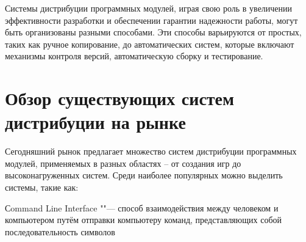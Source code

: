 Системы дистрибуции программных модулей, играя свою роль в увеличении эффективности разработки и обеспечении гарантии надежности работы, могут быть организованы разными способами. Эти способы варьируются от простых, таких как ручное копирование, до автоматических систем, которые включают механизмы контроля версий, автоматическую сборку и тестирование.

\section{Обзор существующих систем дистрибуции на рынке}

Сегодняшний рынок предлагает множество систем дистрибуции программных модулей, применяемых в разных областях – от создания игр до высоконагруженных систем. Среди наиболее популярных можно выделить системы, такие как:



 {Сommand Line Interface ""---  способ взаимодействия между человеком и компьютером путём отправки компьютеру команд, представляющих собой последовательность символов}

